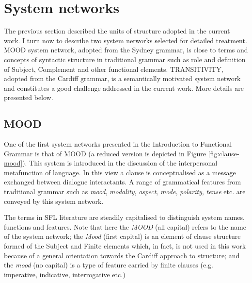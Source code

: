 \section{System networks}
    The previous section described the units of structure adopted in the current work. I turn now to describe two system networks selected for detailed treatment. MOOD system network, adopted from the Sydney grammar, is close to terms and concepts of syntactic structure in traditional grammar such as role and definition of Subject, Complement and other functional elements. %
    TRANSITIVITY, adopted from the Cardiff grammar, is a semantically motivated system network and constitutes a good challenge addressed in the current work. More details are presented below.

    
    
\subsection{MOOD}
\label{sec:mood}

    One of the first system networks presented in the Introduction to Functional Grammar \citep{Halliday2013} is that of MOOD (a reduced version is depicted in Figure \ref{fig:clause-mood}). 
    This system is introduced in the discussion of the interpersonal metafunction of language. In this view a clause is conceptualised as a message exchanged between dialogue interactants. A range of grammatical features from traditional grammar such as \textit{mood}, \textit{modality}, \textit{aspect}, \textit{mode}, \textit{polarity}, \textit{tense} etc. are conveyed by this system network. 
    
    The terms in SFL literature are steadily capitalised to distinguish system names, functions and features. Note that here the \textit{MOOD} (all capital) refers to the name of the system network; the \textit{Mood} (first capital) is an element of clause structure formed of the Subject and Finite elements which, in fact, is not used in this work because of a general orientation towards the Cardiff approach to structure; and the \textit{mood} (no capital) is a type of feature carried by finite clauses (e.g. imperative, indicative, interrogative etc.)

